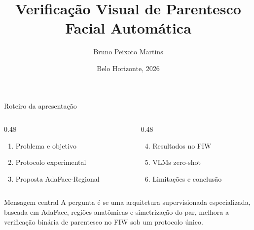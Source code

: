 \documentclass[aspectratio=169,10pt]{beamer}
\title[Verificação visual de parentesco]{Verificação Visual de Parentesco Facial Automática}
\author[Bruno Peixoto Martins]{Bruno Peixoto Martins}
\institute[CEFET-MG]{Engenharia da Computação -- CEFET-MG\\Orientador: Prof. Ismael Santana Silva}
\date{Belo Horizonte, 2026}
\begin{document}
\begin{frame}
  \titlepage
\end{frame}

\begin{frame}{Roteiro da apresentação}
  \begin{columns}[T,onlytextwidth]
    \begin{column}{0.48\textwidth}
      \begin{enumerate}
        \item Problema e objetivo
        \item Protocolo experimental
        \item Proposta AdaFace-Regional
      \end{enumerate}
    \end{column}
    \begin{column}{0.48\textwidth}
      \begin{enumerate}
        \setcounter{enumi}{3}
        \item Resultados no FIW
        \item VLMs zero-shot
        \item Limitações e conclusão
      \end{enumerate}
    \end{column}
  \end{columns}

  \vspace{0.8cm}
  \begin{block}{Mensagem central}
    A pergunta é se uma arquitetura supervisionada especializada, baseada em AdaFace, regiões anatômicas e simetrização do par, melhora a verificação binária de parentesco no FIW sob um protocolo único.
  \end{block}
\end{frame}
\end{document}
